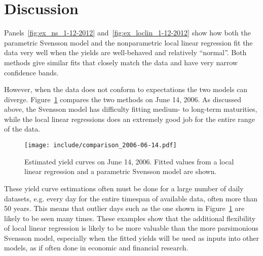 \documentclass[12pt]{article}
\begin{document}
\section{Discussion}

Panels~\ref{fig:ex_ns_1-12-2012} and~\ref{fig:ex_loclin_1-12-2012} show how both the parametric Svensson model and the nonparametric local linear regression fit the data very well when the yields are well-behaved and relatively ``normal''. Both methods give similar fits that closely match the data and have very narrow confidence bands.

However, when the data does not conform to expectations the two models can diverge. Figure~\ref{fig:comparison_bad} compares the two methods on June 14, 2006. As discussed above, the Svensson model has difficulty fitting medium- to long-term maturities, while the local linear regressions does an extremely good job for the entire range of the data.

\begin{figure}[htb]
    \centering
    \texttt{[image: include/comparison\_2006-06-14.pdf]}
    \caption{Estimated yield curves on June 14, 2006. Fitted values from a local linear regression and a parametric Svensson model are shown.}
    \label{fig:comparison_bad}
\end{figure}

These yield curve estimations often must be done for a large number of daily datasets, e.g. every day for the entire timespan of available data, often more than 50 years. This means that outlier days such as the one shown in Figure~\ref{fig:comparison_bad} are likely to be seen many times. These examples show that the additional flexibility of local linear regression is likely to be more valuable than the more parsimonious Svensson model, especially when the fitted yields will be used as inputs into other models, as if often done in economic and financial research.






\vfill
\FloatBarrier


\end{document}
